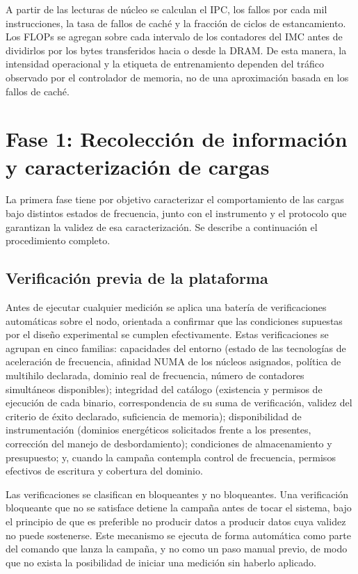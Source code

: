\documentclass[12pt,oneside,spanish]{book}
\begin{document}
A partir de las lecturas de núcleo se calculan el IPC, los fallos por cada mil
instrucciones, la tasa de fallos de caché y la fracción de ciclos de
estancamiento. Los FLOPs se agregan sobre cada intervalo de los contadores del
IMC antes de dividirlos por los bytes transferidos hacia o desde la DRAM. De
esta manera, la intensidad operacional y la etiqueta de entrenamiento dependen
del tráfico observado por el controlador de memoria, no de una aproximación
basada en los fallos de caché.

\section{Fase 1: Recolección de información y caracterización de cargas}

La primera fase tiene por objetivo caracterizar el comportamiento de las cargas bajo distintos estados de frecuencia, junto con el instrumento y el protocolo que garantizan la validez de esa caracterización. Se describe a continuación el procedimiento completo.

\subsection{Verificación previa de la plataforma}
\label{sec:verificacion-previa}

Antes de ejecutar cualquier medición se aplica una batería de verificaciones automáticas sobre el nodo, orientada a confirmar que las condiciones supuestas por el diseño experimental se cumplen efectivamente. Estas verificaciones se agrupan en cinco familias: capacidades del entorno (estado de las tecnologías de aceleración de frecuencia, afinidad NUMA de los núcleos asignados, política de multihilo declarada, dominio real de frecuencia, número de contadores simultáneos disponibles); integridad del catálogo (existencia y permisos de ejecución de cada binario, correspondencia de su suma de verificación, validez del criterio de éxito declarado, suficiencia de memoria); disponibilidad de instrumentación (dominios energéticos solicitados frente a los presentes, corrección del manejo de desbordamiento); condiciones de almacenamiento y presupuesto; y, cuando la campaña contempla control de frecuencia, permisos efectivos de escritura y cobertura del dominio.

Las verificaciones se clasifican en bloqueantes y no bloqueantes. Una verificación bloqueante que no se satisface detiene la campaña antes de tocar el sistema, bajo el principio de que es preferible no producir datos a producir datos cuya validez no puede sostenerse. Este mecanismo se ejecuta de forma automática como parte del comando que lanza la campaña, y no como un paso manual previo, de modo que no exista la posibilidad de iniciar una medición sin haberlo aplicado.
\end{document}
